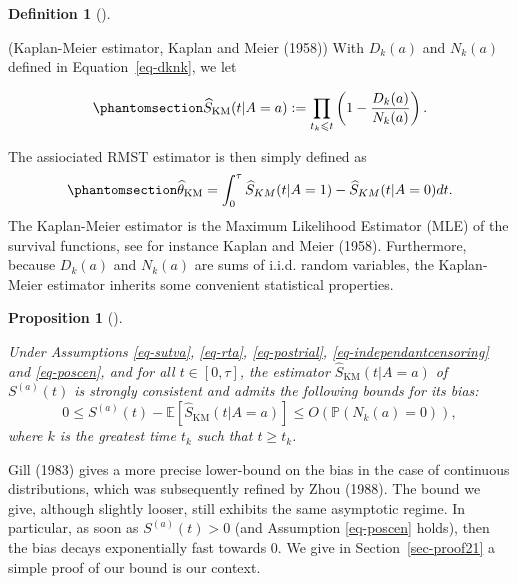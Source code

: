 \documentclass[
  11pt,
  a4paper,
]{article}
\theoremstyle{plain}
\theoremstyle{plain}
\theoremstyle{plain}
\newtheorem{proposition}{Proposition}[section]
\theoremstyle{definition}
\newtheorem{definition}{Definition}[section]
\theoremstyle{remark}
\begin{document}
\begin{definition}[]\protect\hypertarget{def-km}{}\label{def-km}

(Kaplan-Meier estimator, Kaplan and Meier (1958)) With \(D_k(a)\) and
\(N_k(a)\) defined in Equation~\ref{eq-dknk}, we let

\begin{equation}\phantomsection\label{eq-unadjKM}{
    \widehat{S}_{\mathrm{KM}}(t|A=a) := \prod_{t_k \leqslant t}\left(1-\frac{D_k(a)}{N_k(a)}\right).
}\end{equation}

\end{definition}

The assiociated RMST estimator is then simply defined as
\begin{equation}\phantomsection\label{eq-thetaunadjKM}{
\widehat{\theta}_{\mathrm{KM}} = \int_{0}^{\tau}\widehat{S}_{KM}(t|A=1)-\widehat{S}_{KM}(t|A=0)dt.
}\end{equation} The Kaplan-Meier estimator is the Maximum Likelihood
Estimator (MLE) of the survival functions, see for instance Kaplan and
Meier (1958). Furthermore, because \(D_k(a)\) and \(N_k(a)\) are sums of
i.i.d. random variables, the Kaplan-Meier estimator inherits some
convenient statistical properties.

\begin{proposition}[]\protect\hypertarget{prp-km}{}\label{prp-km}

Under Assumptions
\ref{eq-sutva}, \ref{eq-rta}, \ref{eq-postrial}, \ref{eq-independantcensoring}
and \ref{eq-poscen}, and for all \(t \in [0,\tau]\), the estimator
\(\widehat S_{\mathrm{KM}}(t|A=a)\) of \(S^{(a)}(t)\) is strongly
consistent and admits the following bounds for its bias: \[
0 \leqslant S^{(a)}(t) - \mathbb{E}[\widehat S_\mathrm{KM}(t|A=a)] \leqslant O(\mathbb{P}(N_k(a) = 0)),
\] where \(k\) is the greatest time \(t_k\) such that
\(t \geqslant t_k\).

\end{proposition}

Gill (1983) gives a more precise lower-bound on the bias in the case of
continuous distributions, which was subsequently refined by Zhou (1988).
The bound we give, although slightly looser, still exhibits the same
asymptotic regime. In particular, as soon as \(S^{(a)}(t) > 0\) (and
Assumption \ref{eq-poscen} holds), then the bias decays exponentially
fast towards \(0\). We give in Section~\ref{sec-proof21} a simple proof
of our bound is our context.
\end{document}

